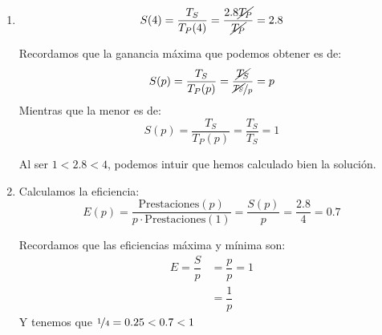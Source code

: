 \begin{ejercicio}
\begin{enumerate}
        \item
        \begin{equation*}
            S(4) = \dfrac{T_S}{T_P(4)} = \dfrac{2.8\cancel{T_P}}{\cancel{T_P}} = 2.8 
        \end{equation*}

        Recordamos que la ganancia máxima que podemos obtener es de:
        \begin{equation*}
            S(p) = \dfrac{T_S}{T_P(p)} = \dfrac{\cancel{T_S}}{\nicefrac{\cancel{T_S}}{p}} = p
        \end{equation*}
        Mientras que la menor es de:
        \begin{equation*}
            S(p) = \dfrac{T_S}{T_P(p)} = \dfrac{T_S}{T_S} = 1
        \end{equation*}

        Al ser $1 < 2.8 < 4$, podemos intuir que hemos calculado bien la solución.

        \item
        Calculamos la eficiencia:
        \begin{equation*}
            E(p) = \dfrac{\text{Prestaciones}(p)}{p\cdot \text{Prestaciones}(1)} = \dfrac{S(p)}{p} = \dfrac{2.8}{4} = 0.7
        \end{equation*}

        Recordamos que las eficiencias máxima y mínima son:
        \begin{align*}
            E = \dfrac{S}{p} &= \dfrac{p}{p} = 1 \\
            &= \dfrac{1}{p}
        \end{align*}
        Y tenemos que $\nicefrac{1}{4} = 0.25 < 0.7 < 1$ 
        
    \end{enumerate}
\end{ejercicio}

